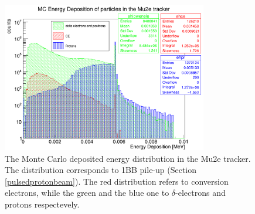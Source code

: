 \begin{figure}[!h]
    \centering
    \includegraphics[width =0.8\textwidth]{figures/png/Screenshot_20240729_151910.png}
\caption[Monte Carlo deposited energy distribution in the Mu2e tracker.]{
   The Monte Carlo deposited energy distribution in the Mu2e tracker. The distribution
   corresponds to 1BB pile-up (Section \ref{pulsedprotonbeam}). The red distribution refers to 
   conversion electrons, while the green and the blue one to $\delta$-electrons and protons respectevely.
}
   \label{fig:energydeposited}
\end{figure}
